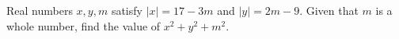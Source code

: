 Real numbers $x,y,m$ satisfy $|x| = 17-3m$ and $|y| = 2m-9$. Given that $m$ is a whole number, find the value of $x^2+y^2+m^2$.
